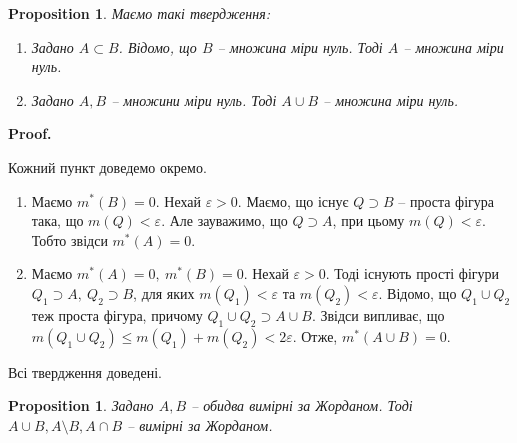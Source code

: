 \documentclass[a4paper, 10pt]{article}
\makeatletter
\def\qed{$\blacksquare$}
\theoremstyle{theoremdd}
\theoremstyle{theoremdd}
\theoremstyle{theoremdd}
\theoremstyle{theoremdd}
\theoremstyle{theoremdd}
\theoremstyle{theoremdd}
\theoremstyle{theoremdd}
\theoremstyle{theoremdd}
\theoremstyle{theoremdd}
\newtheorem{proposition}[theorem]{Proposition}
\theoremstyle{theoremdd}
\theoremstyle{theoremdd}
\theoremstyle{theoremdd}
\theoremstyle{theoremdd}
\theoremstyle{theoremdd}
\theoremstyle{theoremdd}
\renewenvironment{proof}[1][Proof.\\]{\par
\pushQED{\hfill \qed}%
\normalfont \topsep6\p@\@plus6\p@\relax
\trivlist
\item\relax
{\bfseries
#1\@addpunct{.}}\hspace\labelsep\ignorespaces
}{%
\popQED\endtrivlist\@endpefalse
}
\makeatother
\begin{document}
\begin{proposition} Маємо такі твердження:
\begin{enumerate}[nosep,wide=0pt,label={\arabic*)}]
\item Задано $A \subset B$. Відомо, що $B$ -- множина міри нуль. Тоді $A$ -- множина міри нуль.
\item Задано $A,B$ -- множини міри нуль. Тоді $A \cup B$ -- множина міри нуль.
\end{enumerate}
\end{proposition}

\begin{proof}
Кожний пункт доведемо окремо.
\begin{enumerate}[wide=0pt,label={\arabic*)}]
\item Маємо $m^*(B) = 0$. Нехай $\varepsilon > 0$. Маємо, що існує $Q \supset B$ -- проста фігура така, що $m(Q) < \varepsilon$. Але зауважимо, що $Q \supset A$, при цьому $m(Q) < \varepsilon$. Тобто звідси $m^*(A) = 0$.
\item Маємо $m^*(A) = 0,\ m^*(B) = 0$. Нехай $\varepsilon > 0$. Тоді існують прості фігури $Q_1 \supset A,\ Q_2 \supset B$, для яких $m(Q_1) < \varepsilon$ та $m(Q_2) < \varepsilon$. Відомо, що $Q_1 \cup Q_2$ теж проста фігура, причому $Q_1 \cup Q_2 \supset A \cup B$. Звідси випливає, що $m(Q_1 \cup Q_2) \leq m(Q_1) + m(Q_2) < 2\varepsilon$. Отже, $m^*(A \cup B) = 0$.
\end{enumerate}
Всі твердження доведені.
\end{proof}

\begin{proposition}
Задано $A,B$ -- обидва вимірні за Жорданом. Тоді $A \cup B, A \setminus B, A \cap B$ -- вимірні за Жорданом.
\end{proposition}
\end{document}
